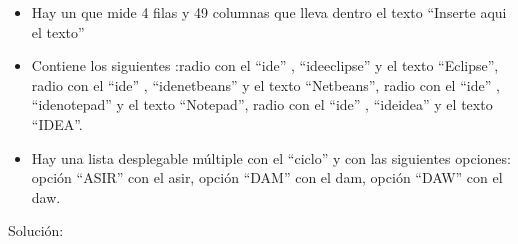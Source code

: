 \documentclass[letterpaper,10pt,spanish]{sphinxmanual}
\begin{document}
\begin{itemize}
\item {} 
Hay un  que mide 4 filas y 49 columnas que lleva dentro el texto ``Inserte aqui el texto''

\item {} 
Contiene los siguientes :radio con el   ``ide'' ,   ``ideeclipse''  y el texto ``Eclipse'', radio con el   ``ide'' ,   ``idenetbeans''  y el texto ``Netbeans'', radio con el   ``ide'' ,   ``idenotepad''  y el texto ``Notepad'', radio con el   ``ide'' ,   ``ideidea''  y el texto ``IDEA''.

\item {} 
Hay una lista desplegable múltiple con el  ``ciclo'' y con las siguientes opciones: opción ``ASIR'' con el  asir, opción ``DAM'' con el  dam, opción ``DAW'' con el  daw.

\end{itemize}


Solución:
\end{document}
